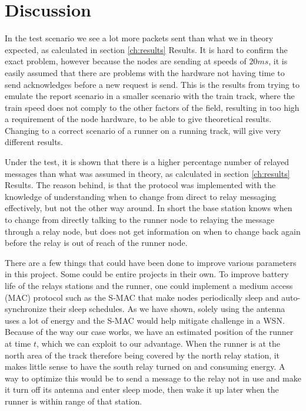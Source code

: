 \section{Discussion}
\noindent In the test scenario we see a lot more packets sent than what we in theory expected, as calculated in section \ref{ch:results} Results. It is hard to confirm the exact problem, however because the nodes are sending at speeds of $20ms$, it is easily assumed that there are problems with the hardware not having time to send acknowledges before a new request is send. This is the results from trying to emulate the report scenario in a smaller scenario with the train track, where the train speed does not comply to the other factors of the field, resulting in too high a requirement of the node hardware, to be able to give theoretical results. Changing to a correct scenario of a runner on a running track, will give very different results.

\noindent Under the test, it is shown that there is a higher percentage number of relayed messages than what was assumed in theory, as calculated in section \ref{ch:results} Results. The reason behind, is that the protocol was implemented with the knowledge of understanding when to change from direct to relay messaging effectively, but not the other way around. In short the base station knows when to change from directly talking to the runner node to relaying the message through a relay node, but does not get information on when to change back again before the relay is out of reach of the runner node.

\noindent There are a few things that could have been done to improve various parameters in this project. Some could be entire projects in their own. To improve battery life of the relays stations and the runner, one could implement a medium access (MAC) protocol such as the S-MAC that make nodes periodically sleep and auto-synchronize their sleep schedules. As we have shown, solely using the antenna uses a lot of energy and the S-MAC would help mitigate challenge in a WSN. Because of the way our case works, we have an estimated position of the runner at time $t$, which we can exploit to our advantage. When the runner is at the north area of the track therefore being covered by the north relay station, it makes little sense to have the south relay turned on and consuming energy. A way to optimize this would be to send a message to the relay not in use and make it turn off its antenna and enter sleep mode, then wake it up later when the runner is within range of that station.

